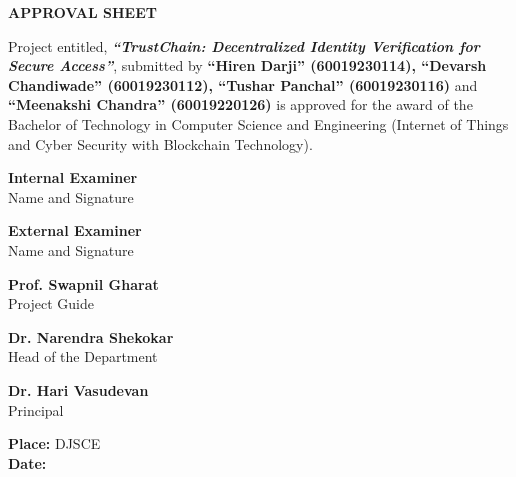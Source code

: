 \begin{titlepage}
    \vspace*{1cm}

    \begin{center}
        {\Large \textbf{APPROVAL SHEET}}
    \end{center}

    \vspace{1cm}

    \begin{center}
    Project entitled, \textit{\textbf{“TrustChain: Decentralized Identity Verification for Secure Access”}}, submitted by \textbf{“Hiren Darji” (60019230114), “Devarsh Chandiwade” (60019230112), “Tushar Panchal” (60019230116)} and \textbf{“Meenakshi Chandra” (60019220126)} is approved for the award of the Bachelor of Technology in Computer Science and Engineering (Internet of Things and Cyber Security with Blockchain Technology).
    \end{center}

    \vspace{2cm}

    \noindent
    \begin{minipage}[t]{0.45\textwidth}
        \centering
        \textbf{Internal Examiner} \\
        Name and Signature
    \end{minipage}
    \hfill
    \begin{minipage}[t]{0.45\textwidth}
        \centering
        \textbf{External Examiner} \\
        Name and Signature
    \end{minipage}

    \vspace{2.5cm}

    \noindent
    \begin{minipage}[t]{0.45\textwidth}
        \centering
        \textbf{Prof. Swapnil Gharat} \\
        Project Guide
    \end{minipage}
    \hfill
    \begin{minipage}[t]{0.45\textwidth}
        \centering
        \textbf{Dr. Narendra Shekokar} \\
        Head of the Department
    \end{minipage}

    \vspace{2.5cm}

    \begin{center}
        \textbf{Dr. Hari Vasudevan} \\
        Principal
    \end{center}

    \vspace{1cm}

    \noindent
    \textbf{Place:} DJSCE \hspace{3cm} \\
    \textbf{Date:} \hspace{3cm} 

\end{titlepage}
